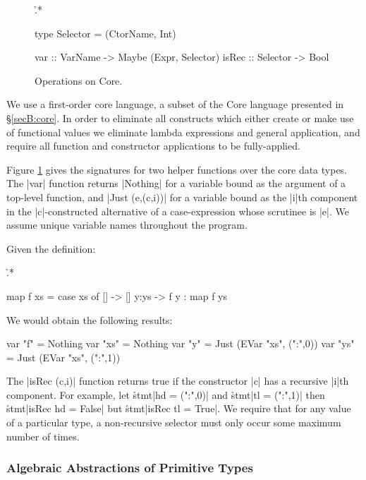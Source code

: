 \begin{figure}
\h{.*}\begin{code}
type Selector  =  (CtorName, Int)

var    :: VarName   -> Maybe (Expr, Selector)
isRec  :: Selector  -> Bool
\end{code}
\caption{Operations on Core.}
\label{figC:catch_core_operations}
\end{figure}

We use a first-order core language, a subset of the Core language presented in \S\ref{secB:core}. In order to eliminate all constructs which either create or make use of functional values we eliminate lambda expressions and general application, and require all function and constructor applications to be fully-applied.

Figure \ref{figC:catch_core_operations} gives the signatures for two helper functions over the core data types. The |var| function returns |Nothing| for a variable bound as the argument of a top-level function, and |Just (e,(c,i))| for a variable bound as the |i|th component in the |c|-constructed alternative of a case-expression whose scrutinee is |e|. We assume unique variable names throughout the program.

\begin{example}
Given the definition:

\h{.*}\begin{code}
map f xs = case  xs of
                 []    -> []
                 y:ys  -> f y : map f ys
\end{code}

We would obtain the following results:

\begin{code}
var "f"   = Nothing
var "xs"  = Nothing
var "y"   = Just (EVar "xs", (":",0))
var "ys"  = Just (EVar "xs", (":",1))
\end{code}
\end{example}

The |isRec (c,i)| function returns true if the constructor |c| has a recursive |i|th component. For example, let \h{stmt}|hd = (":",0)| and \h{stmt}|tl = (":",1)| then \h{stmt}|isRec hd = False| but \h{stmt}|isRec tl = True|. We require that for any value of a particular type, a non-recursive selector must only occur some maximum number of times.


\subsubsection{Algebraic Abstractions of Primitive Types}
\label{secC:abstraction}

